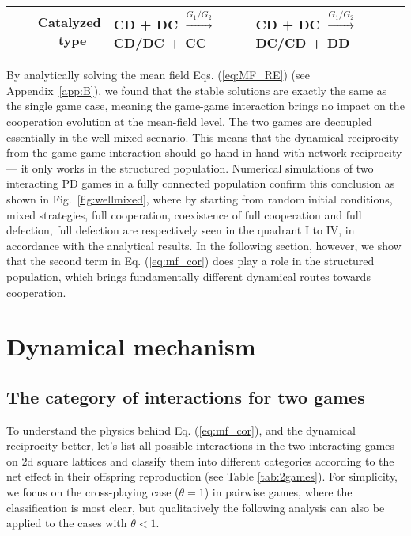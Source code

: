 \documentclass[showpacs,superscriptaddress,reprint,nofootinbib,amsmath,amssymb,aps,pre]{revtex4-1}
\begin{document}
\begin{table*}[]
\begin{tabular}{@{}rlll@{}}
Catalyzed type~~       & \cellcolor[HTML]{EFEFEF}CD + DC $\xrightarrow{   G_1/G_2   }$ CD/DC + CC                                
                                   & \cellcolor[HTML]{EFEFEF}CD + DC $\xrightarrow{   G_1/G_2   }$ DC/CD + DD                                                                         
                                   &  \\ \bottomrule
\hline
\end{tabular}
\caption{Categories of interactions in 2 interacting PD games within the cross-playing scheme ($\theta=1$). Six pairwise interactions are classified into three categories in either individual or bulk scenarios.}
\label{tab:2games}
\end{table*}

By analytically solving the mean field Eqs. (\ref{eq:MF_RE}) (see Appendix~\ref{app:B}), we found that the stable solutions are exactly the same as the single game case, meaning the game-game interaction brings no impact on the cooperation evolution at the mean-field level. The two games are decoupled essentially in the well-mixed scenario. This means that the dynamical reciprocity from the game-game interaction should go hand in hand with network reciprocity --- it only works in the structured population.
Numerical simulations of two interacting PD games in a fully connected population confirm this conclusion as shown in Fig.~\ref{fig:wellmixed}, where by starting from random initial conditions, mixed strategies, full cooperation, coexistence of full cooperation and full defection, full defection are respectively seen in the quadrant I to IV, in accordance with the analytical results. In the following section, however, we show that the second term in Eq. (\ref{eq:mf_cor}) does play a role in the structured population, which brings fundamentally different dynamical routes towards cooperation.

\section{Dynamical mechanism}\label{sec:mechanism}
\subsection{The category of interactions for two games}\label{subsec:classification}
To understand the physics behind Eq. (\ref{eq:mf_cor}), and the dynamical reciprocity better, let's list all possible interactions in the two interacting games on 2d square lattices and classify them into different categories according to the net effect in their offspring reproduction (see Table \ref{tab:2games}). For simplicity, we focus on the cross-playing case ($\theta=1$) in pairwise games, where the classification is most clear, but qualitatively the following analysis can also be applied to the cases with $\theta<1$. 
\end{document}
